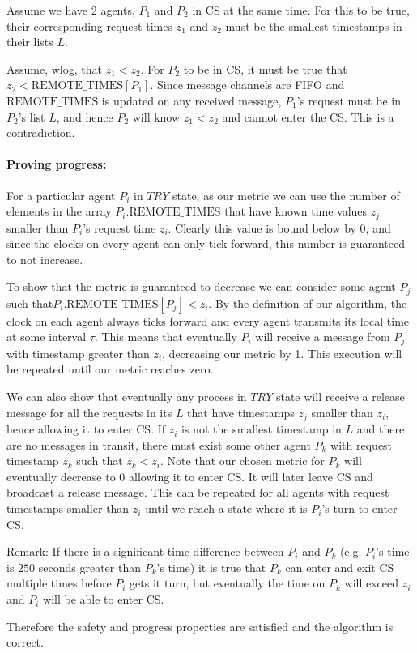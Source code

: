 \documentclass[10pt,letter]{article}
\begin{document}
Assume we have 2 agents, $P_1$ and $P_2$ in CS at the same time. For this to be true, their corresponding request times $z_1$ and $z_2$ must be the smallest timestamps in their lists $L$.

Assume, wlog, that $z_1 < z_2$. For $P_2$ to be in CS, it must be true that $z_2 < \textrm{REMOTE\_TIMES}[P_1]$. Since message channels are FIFO and $\textrm{REMOTE\_TIMES}$ is updated on any received message, $P_1$'s request must be in $P_2$'s list $L$, and hence $P_2$ will know $z_1 < z_2$ and cannot enter the CS. This is a contradiction.

\paragraph{Proving progress:} For a particular agent $P_i$ in $TRY$ state, as our metric we can use the number of elements in the array $P_i.\textrm{REMOTE\_TIMES}$ that have known time values $z_j$ smaller than $P_i$'s request time $z_i$. Clearly this value is bound below by $0$, and since the clocks on every agent can only tick forward, this number is guaranteed to not increase.

To show  that the metric is guaranteed to decrease we can consider some agent $P_j$ such that\linebreak[4]\mbox{$P_i.\textrm{REMOTE\_TIMES}[P_j] < z_i$}. By the definition of our algorithm, the clock on each agent always ticks forward and every agent transmits its local time at some interval $\tau$. This means that eventually $P_i$ will receive a message from $P_j$ with timestamp greater than $z_i$, decreasing our metric by 1. This execution will be repeated until our metric reaches zero.

We can also show that eventually any process in $TRY$ state will receive a release message for all the requests in its $L$ that have timestamps $z_j$ smaller than $z_i$, hence allowing it to enter CS. If $z_i$ is not the smallest timestamp in $L$ and there are no messages in transit, there must exist some other agent $P_k$ with request timestamp $z_k$ such that $z_k < z_i$. Note that our chosen metric for $P_k$ will eventually decrease to $0$ allowing it to enter CS. It will later leave CS and broadcast a release message. This can be repeated for all agents with request timestamps smaller than $z_i$ until we reach a state where it is $P_i$'s turn to enter CS.

Remark: If there is a significant time difference between $P_i$ and $P_k$ (e.g. $P_i$'s time is $250$ seconds greater than $P_k$'s time) it is true that $P_k$ can enter and exit CS multiple times before $P_i$ gets it turn, but eventually the time on $P_k$ will exceed $z_i$ and $P_i$ will be able to enter CS.

Therefore the safety and progress properties are satisfied and the algorithm is correct.
\end{document}
